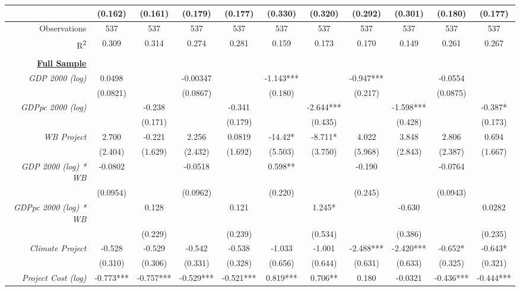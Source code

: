 \documentclass{article}
\begin{document}
\begin{singlespace}
\begin{landscape}
\begin{table}[H]
{\begin{tabular}{rcccccccccc}
					\textit{} & (0.162) & (0.161) & (0.179) & (0.177) & (0.330) & (0.320) & (0.292) & (0.301) & (0.180) & (0.177) \\ \hline
					Observations & 537 & 537 & 537 & 537 & 537 & 537 & 537 & 537 & 537 & 537 \\
					R\textsuperscript{2} & 0.309 & 0.314 & 0.274 & 0.281 & 0.159 & 0.173 & 0.170 & 0.149 & 0.261 & 0.267 \\ \hline
					\multicolumn{1}{l}{} & \multicolumn{1}{l}{} & \multicolumn{1}{l}{} & \multicolumn{1}{l}{} & \multicolumn{1}{l}{} & \multicolumn{1}{l}{} & \multicolumn{1}{l}{} & \multicolumn{1}{l}{} & \multicolumn{1}{l}{} & \multicolumn{1}{l}{} & \multicolumn{1}{l}{} \\
					{\ul \textbf{Full Sample}} &  &  &  &  &  &  &  &  &  &  \\
					\textit{GDP 2000 (log)} & 0.0498 &  & -0.00347 &  & -1.143*** &  & -0.947*** &  & -0.0554 &  \\
					\textit{} & (0.0821) &  & (0.0867) &  & (0.180) &  & (0.217) &  & (0.0875) &  \\
					\textit{GDPpc 2000 (log)} &  & -0.238 &  & -0.341 &  & -2.644*** &  & -1.598*** &  & -0.387* \\
					\textit{} &  & (0.171) &  & (0.179) &  & (0.435) &  & (0.428) &  & (0.173) \\
					\textit{WB Project} & 2.700 & -0.221 & 2.256 & 0.0819 & -14.42* & -8.711* & 4.022 & 3.848 & 2.806 & 0.694 \\
					\textit{} & (2.404) & (1.629) & (2.432) & (1.692) & (5.503) & (3.750) & (5.968) & (2.843) & (2.387) & (1.667) \\
					\textit{GDP 2000 (log) * WB} & -0.0802 &  & -0.0518 &  & 0.598** &  & -0.190 &  & -0.0764 &  \\
					\textit{} & (0.0954) &  & (0.0962) &  & (0.220) &  & (0.245) &  & (0.0943) &  \\
					\textit{GDPpc 2000 (log) * WB} &  & 0.128 &  & 0.121 &  & 1.245* &  & -0.630 &  & 0.0282 \\
					\textit{} &  & (0.229) &  & (0.239) &  & (0.534) &  & (0.386) &  & (0.235) \\
					\textit{Climate Project} & -0.528 & -0.529 & -0.542 & -0.538 & -1.033 & -1.001 & -2.488*** & -2.420*** & -0.652* & -0.643* \\
					\textit{} & (0.310) & (0.306) & (0.331) & (0.328) & (0.656) & (0.644) & (0.631) & (0.633) & (0.325) & (0.321) \\
					\textit{Project Cost (log)} & -0.773*** & -0.757*** & -0.529*** & -0.521*** & 0.819*** & 0.706** & 0.180 & -0.0321 & -0.436*** & -0.444*** \\

\end{tabular}}
\end{table}
\end{landscape}
\end{singlespace}
\end{document}
